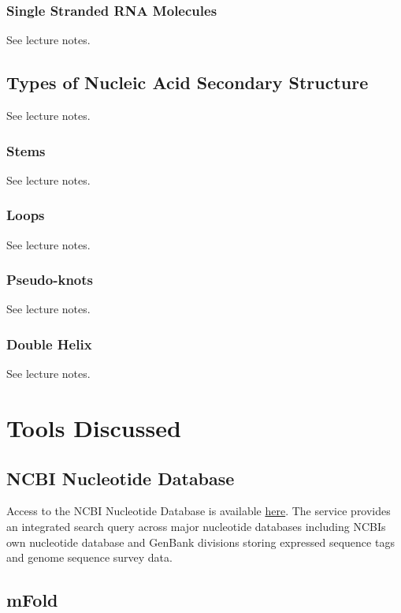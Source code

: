         \subsubsection{Single Stranded RNA Molecules}
        See lecture notes.\autocite{T8}

    \subsection{Types of Nucleic Acid Secondary Structure}
    See lecture notes.\autocite{T8}

        \subsubsection{Stems}
        See lecture notes.\autocite{T8}

        \subsubsection{Loops}
        See lecture notes.\autocite{T8}

        \subsubsection{Pseudo-knots}
        See lecture notes.\autocite{T8}

        \subsubsection{Double Helix}
        See lecture notes.\autocite{T8}

\section{Tools Discussed}

    \subsection{NCBI Nucleotide Database}

    Access to the NCBI Nucleotide Database is available \href{https://www.ncbi.nlm.nih.gov/nucleotide/}{here}. The service provides an integrated search query across major nucleotide databases including NCBIs own nucleotide database and GenBank divisions storing expressed sequence tags and genome sequence survey data.\autocite{B18} 

    \subsection{mFold}

